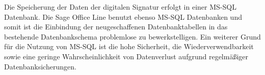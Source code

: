 Die Speicherung der Daten der digitalen Signatur erfolgt in einer MS-SQL Datenbank. Die Sage Office Line benutzt ebenso MS-SQL Datenbanken und somit ist die Einbindung der neugeschaffenen Datenbanktabellen in das bestehende Datenbankschema problemlose zu bewerkstelligen. Ein weiterer Grund für die Nutzung von MS-SQL ist die hohe Sicherheit, die Wiederverwendbarkeit sowie eine geringe Wahrscheinlichkeit von Datenverlust aufgrund regelmäßiger Datenbanksicherungen.